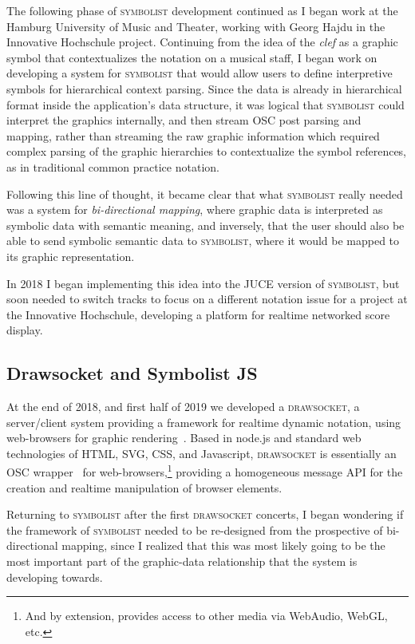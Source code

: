 \documentclass{article}
\def\symbolist{\textsc{symbolist}\xspace}
\def\drawsocket{\textsc{drawsocket}\xspace}
\begin{document}
The following phase of \symbolist development continued as I began work at the Hamburg University of Music and Theater, working with Georg Hajdu in the Innovative Hochschule project. 
Continuing from the idea of the \textit{clef} as a graphic symbol that contextualizes the notation on a musical staff, I began work on developing a system for \symbolist that would allow users to define interpretive symbols for hierarchical context parsing.
Since the data is already in hierarchical format inside the application's data structure, it was logical that \symbolist could interpret the graphics internally, and then stream OSC post parsing and mapping, rather than streaming the raw graphic information which required complex parsing of the graphic hierarchies to contextualize the symbol references, as in traditional common practice notation.

Following this line of thought, it became clear that what \symbolist really needed was a system for \textit{bi-directional mapping}, where graphic data is interpreted as symbolic data with semantic meaning, and inversely, that the user should also be able to send symbolic semantic data to \symbolist, where it would be mapped to its graphic representation.

In 2018 I began implementing this idea into the JUCE version of \symbolist, but soon needed to switch tracks to focus on a different notation issue for a project at the Innovative Hochschule, developing a platform for realtime networked score display.

\subsection*{Drawsocket and Symbolist JS}\label{sec:drawsocket}

At the end of 2018, and first half of 2019 we developed a \drawsocket, a server/client system providing a framework for realtime dynamic notation, using web-browsers for graphic rendering~\cite{gottfried2019drawsocket, hajdu2005quintet}. 
Based in node.js and standard web technologies of HTML, SVG, CSS, and Javascript, \drawsocket is essentially an OSC wrapper~\cite{freed2014io} for web-browsers,\footnote{And by extension, provides access to other media via WebAudio, WebGL, etc.} providing a homogeneous message API for the creation and realtime manipulation of browser elements.

Returning to \symbolist after the first \drawsocket concerts, I began wondering if the framework of \symbolist needed to be re-designed from the prospective of bi-directional mapping, since I realized that this was most likely going to be the most important part of the graphic-data relationship that the system is developing towards. 
\end{document}
